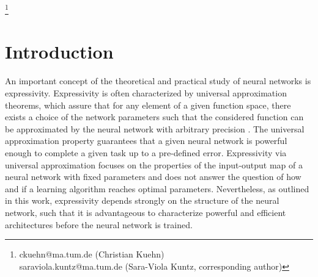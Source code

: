\documentclass[10pt]{article}
\numberwithin{equation}{section}
\newcommand\blfootnote[1]{%
	\begingroup
	\renewcommand\thefootnote{}\footnote{#1}%
	\addtocounter{footnote}{-1}%
	\endgroup
}
\begin{document}
	\vspace{1mm}
	
	
	\vspace{-2mm}
	
	\blfootnote{\hspace{-5.4mm}\Letter \; ckuehn@ma.tum.de (Christian Kuehn)  \\
		\Letter\; saraviola.kuntz@ma.tum.de (Sara-Viola Kuntz, corresponding author)}
	
	\tableofcontents
	
	
	
	\section{Introduction}
	
	An important concept of the theoretical and practical study of neural networks is expressivity. Expressivity is often characterized by universal approximation theorems, which assure that for any element of a given function space, there exists a choice of the network parameters such that the considered function can be approximated by the neural network with arbitrary precision \cite{Kratsios2021}. The universal approximation property guarantees that a given neural network is powerful enough to complete a given task up to a pre-defined error.	Expressivity via universal approximation focuses on the properties of the input-output map of a neural network with fixed parameters and does not answer the question of how and if a learning algorithm reaches optimal parameters. Nevertheless, as outlined in this work, expressivity depends strongly on the structure of the neural network, such that it is advantageous to characterize powerful and efficient architectures before the neural network is trained. 
	
\end{document}
